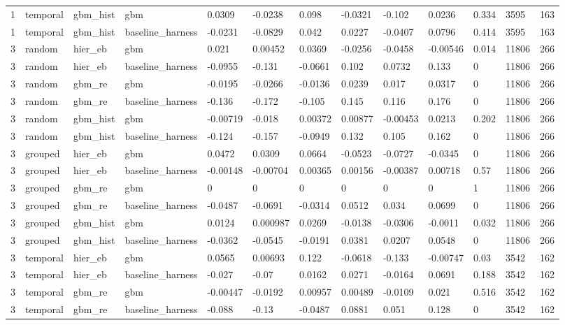 \begin{tabular}{lllllllllllll}
1 & temporal & gbm\_hist & gbm & 0.0309 & -0.0238 & 0.098 & -0.0321 & -0.102 & 0.0236 & 0.334 & 3595 & 163 \\
1 & temporal & gbm\_hist & baseline\_harness & -0.0231 & -0.0829 & 0.042 & 0.0227 & -0.0407 & 0.0796 & 0.414 & 3595 & 163 \\
3 & random & hier\_eb & gbm & 0.021 & 0.00452 & 0.0369 & -0.0256 & -0.0458 & -0.00546 & 0.014 & 11806 & 266 \\
3 & random & hier\_eb & baseline\_harness & -0.0955 & -0.131 & -0.0661 & 0.102 & 0.0732 & 0.133 & 0 & 11806 & 266 \\
3 & random & gbm\_re & gbm & -0.0195 & -0.0266 & -0.0136 & 0.0239 & 0.017 & 0.0317 & 0 & 11806 & 266 \\
3 & random & gbm\_re & baseline\_harness & -0.136 & -0.172 & -0.105 & 0.145 & 0.116 & 0.176 & 0 & 11806 & 266 \\
3 & random & gbm\_hist & gbm & -0.00719 & -0.018 & 0.00372 & 0.00877 & -0.00453 & 0.0213 & 0.202 & 11806 & 266 \\
3 & random & gbm\_hist & baseline\_harness & -0.124 & -0.157 & -0.0949 & 0.132 & 0.105 & 0.162 & 0 & 11806 & 266 \\
3 & grouped & hier\_eb & gbm & 0.0472 & 0.0309 & 0.0664 & -0.0523 & -0.0727 & -0.0345 & 0 & 11806 & 266 \\
3 & grouped & hier\_eb & baseline\_harness & -0.00148 & -0.00704 & 0.00365 & 0.00156 & -0.00387 & 0.00718 & 0.57 & 11806 & 266 \\
3 & grouped & gbm\_re & gbm & 0 & 0 & 0 & 0 & 0 & 0 & 1 & 11806 & 266 \\
3 & grouped & gbm\_re & baseline\_harness & -0.0487 & -0.0691 & -0.0314 & 0.0512 & 0.034 & 0.0699 & 0 & 11806 & 266 \\
3 & grouped & gbm\_hist & gbm & 0.0124 & 0.000987 & 0.0269 & -0.0138 & -0.0306 & -0.0011 & 0.032 & 11806 & 266 \\
3 & grouped & gbm\_hist & baseline\_harness & -0.0362 & -0.0545 & -0.0191 & 0.0381 & 0.0207 & 0.0548 & 0 & 11806 & 266 \\
3 & temporal & hier\_eb & gbm & 0.0565 & 0.00693 & 0.122 & -0.0618 & -0.133 & -0.00747 & 0.03 & 3542 & 162 \\
3 & temporal & hier\_eb & baseline\_harness & -0.027 & -0.07 & 0.0162 & 0.0271 & -0.0164 & 0.0691 & 0.188 & 3542 & 162 \\
3 & temporal & gbm\_re & gbm & -0.00447 & -0.0192 & 0.00957 & 0.00489 & -0.0109 & 0.021 & 0.516 & 3542 & 162 \\
3 & temporal & gbm\_re & baseline\_harness & -0.088 & -0.13 & -0.0487 & 0.0881 & 0.051 & 0.128 & 0 & 3542 & 162 \\

\end{tabular}

